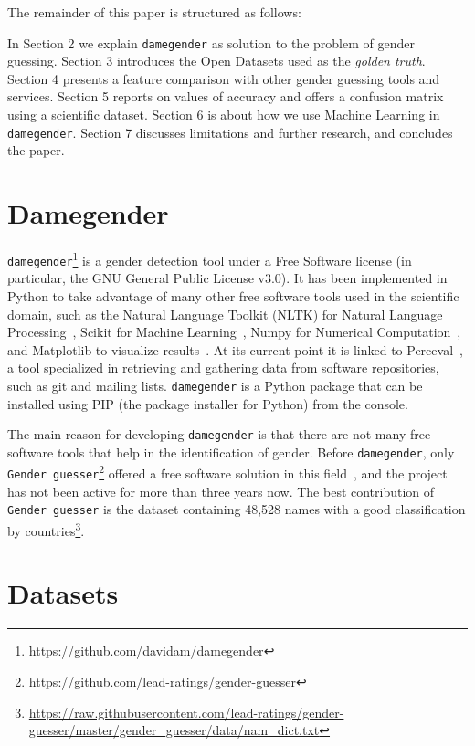 \documentclass[a4paper]{article}
\begin{document}
The remainder of this paper is structured as follows:

In Section 2 we explain \texttt{damegender} as solution to the
problem of gender guessing. Section 3 introduces the Open Datasets used as the \emph{golden truth}.
Section 4 presents a feature comparison with other gender guessing tools and services.
Section 5 reports on values of accuracy and offers a confusion matrix using a scientific dataset.
Section 6 is about how we use Machine Learning in \texttt{damegender}.
Section 7 discusses limitations and further research, and concludes the paper.

\section{Damegender}

\texttt{damegender}\footnote{https://github.com/davidam/damegender} is a gender detection tool under a Free Software license (in particular, the GNU General Public License v3.0). 
It has been implemented in Python to take advantage of many other free software tools used in the scientific domain, such as the Natural Language Toolkit (NLTK) for Natural Language Processing~\cite{loper2002nltk}, Scikit for Machine Learning~\cite{pedregosa2011scikit}, Numpy for Numerical Computation~\cite{van2011numpy}, and Matplotlib to visualize results~\cite{hunter2007matplotlib}. 
At its current point it is linked to Perceval~\cite{duenas2018perceval}, a tool specialized in retrieving and gathering data from software repositories, such as git and mailing lists.
\texttt{damegender} is a Python package that can be installed using PIP (the package installer for Python) from the console.


The main reason for developing \texttt{damegender} is that there are not many free software tools that help in the identification of gender. Before \texttt{damegender}, only \texttt{Gender guesser}\footnote{https://github.com/lead-ratings/gender-guesser} offered a free software solution in this field~\cite{krawetz2006gender}, and the project has not been active for more than three years now.
The best contribution of \texttt{Gender guesser} is the dataset containing 48,528 names with a good classification by countries\footnote{\url{https://raw.githubusercontent.com/lead-ratings/gender-guesser/master/gender_guesser/data/nam_dict.txt}}.

\section{Datasets}
\end{document}
